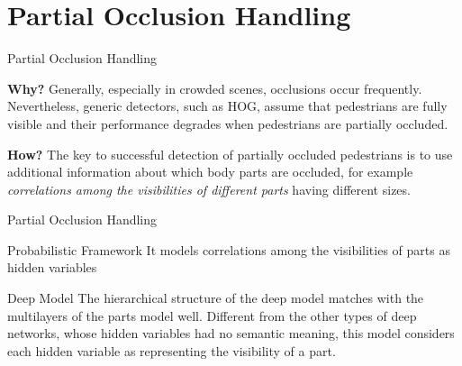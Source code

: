 \begin{frame}[plain]
\end{frame}

\section{Partial Occlusion Handling}
\label{sec:Partial Occlusion Handling}


\begin{frame}{Partial Occlusion Handling}
\small
{}

  \begin{alertblock}{\textbf{Why?}}
  Generally, especially in crowded scenes, occlusions occur frequently.
  Nevertheless, generic detectors, such as HOG, assume that pedestrians are fully
  visible and their performance degrades when pedestrians are partially occluded.
  \end{alertblock}
\pause

  \begin{exampleblock}{\textbf{How?}}
  The key to successful detection of partially occluded pedestrians is to use additional
  information about which body parts are occluded, for example \textit{correlations among
  the visibilities of different parts} having different sizes.
  \end{exampleblock}

\end{frame}


\begin{frame}{Partial Occlusion Handling}
  \begin{alertblock}{Probabilistic Framework}
    It models correlations among the visibilities of parts as hidden variables
  \end{alertblock}

\pause

  \begin{exampleblock}{Deep Model}
    The hierarchical structure of the deep model matches with the multilayers of
    the parts model well.
    Different from the other types of deep networks, whose hidden variables had
    no semantic meaning, this model considers each hidden variable as representing
    the visibility of a part.
  \end{exampleblock}

\end{frame}


